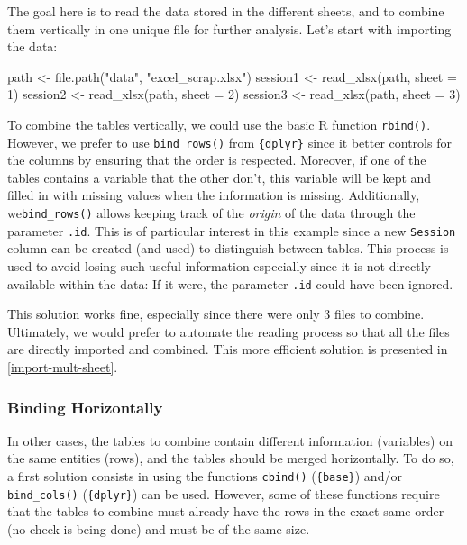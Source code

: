 \documentclass[
]{krantz}
\makeatletter
\newenvironment{Shaded}{\begin{snugshade}}{\end{snugshade}}
\newcommand{\AttributeTok}[1]{\textcolor[rgb]{0.61,0.61,0.61}{#1}}
\newcommand{\DecValTok}[1]{\textcolor[rgb]{0.06,0.06,0.06}{#1}}
\newcommand{\FunctionTok}[1]{\textcolor[rgb]{0,0,0}{#1}}
\newcommand{\NormalTok}[1]{#1}
\newcommand{\OtherTok}[1]{\textcolor[rgb]{0.37,0.37,0.37}{#1}}
\newcommand{\StringTok}[1]{\textcolor[rgb]{0.5,0.5,0.5}{#1}}
\newenvironment{kframe}{%
\medskip{}
\setlength{\fboxsep}{.8em}
 \def\at@end@of@kframe{}%
 \ifinner\ifhmode%
  \def\at@end@of@kframe{\end{minipage}}%
  \begin{minipage}{\columnwidth}%
 \fi\fi%
 \def\FrameCommand##1{\hskip\@totalleftmargin \hskip-\fboxsep
 \colorbox{shadecolor}{##1}\hskip-\fboxsep
     \hskip-\linewidth \hskip-\@totalleftmargin \hskip\columnwidth}%
 \MakeFramed {\advance\hsize-\width
   \@totalleftmargin\z@ \linewidth\hsize
   \@setminipage}}%
 {\par\unskip\endMakeFramed%
 \at@end@of@kframe}
\renewenvironment{Shaded}{\begin{kframe}}{\end{kframe}}
\makeatother
\begin{document}
The goal here is to read the data stored in the different sheets, and to combine them vertically in one unique file for further analysis. Let's start with importing the data:

\begin{Shaded}
\begin{Highlighting}[]
\NormalTok{path }\OtherTok{\textless{}{-}} \FunctionTok{file.path}\NormalTok{(}\StringTok{"data"}\NormalTok{, }\StringTok{"excel\_scrap.xlsx"}\NormalTok{)}
\NormalTok{session1 }\OtherTok{\textless{}{-}} \FunctionTok{read\_xlsx}\NormalTok{(path, }\AttributeTok{sheet =} \DecValTok{1}\NormalTok{)}
\NormalTok{session2 }\OtherTok{\textless{}{-}} \FunctionTok{read\_xlsx}\NormalTok{(path, }\AttributeTok{sheet =} \DecValTok{2}\NormalTok{)}
\NormalTok{session3 }\OtherTok{\textless{}{-}} \FunctionTok{read\_xlsx}\NormalTok{(path, }\AttributeTok{sheet =} \DecValTok{3}\NormalTok{)}
\end{Highlighting}
\end{Shaded}

To combine the tables vertically, we could use the basic R function \texttt{rbind()}. However, we prefer to use \texttt{bind\_rows()} from \texttt{\{dplyr\}} since it better controls for the columns by ensuring that the order is respected. Moreover, if one of the tables contains a variable that the other don't, this variable will be kept and filled in with missing values when the information is missing. Additionally, we\texttt{bind\_rows()} allows keeping track of the \emph{origin} of the data through the parameter \texttt{.id}. This is of particular interest in this example since a new \texttt{Session} column can be created (and used) to distinguish between tables. This process is used to avoid losing such useful information especially since it is not directly available within the data: If it were, the parameter \texttt{.id} could have been ignored.

This solution works fine, especially since there were only 3 files to combine. Ultimately, we would prefer to automate the reading process so that all the files are directly imported and combined. This more efficient solution is presented in \ref{import-mult-sheet}.

\hypertarget{binding-horizontally}{%
\subsubsection{Binding Horizontally}\label{binding-horizontally}}

In other cases, the tables to combine contain different information (variables) on the same entities (rows), and the tables should be merged horizontally. To do so, a first solution consists in using the functions \texttt{cbind()} (\texttt{\{base\}}) and/or \texttt{bind\_cols()} (\texttt{\{dplyr\}}) can be used. However, some of these functions require that the tables to combine must already have the rows in the exact same order (no check is being done) and must be of the same size.
\end{document}

